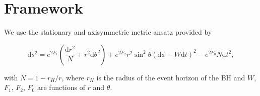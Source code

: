 \documentclass{aa}
\begin{document}



\section{Framework}

We use the stationary and axisymmetric metric ansatz provided by\citet{Herdeiro:2014a}

\begin{equation}
\mathrm{d}s^2 = e^{2F_1}\left(\frac{\mathrm{d}r^2}{N} + r^2\mathrm{d}\theta^2\right) + e^{2F_2}r^2\sin^2 \theta(\mathrm{d}\phi-W\mathrm{d}t)^2-e^{2F_0}N\mathrm{d}t^2,
\end{equation}

with $N = 1 - r_H/r$, where $r_H$ is the radius of the event horizon of the BH and $W$, $F_1$, $F_2$, $F_0$ are functions of $r$ and $\theta$.
\end{document}
